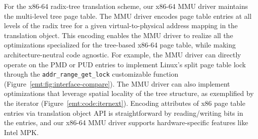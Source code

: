 For the x86-64 radix-tree translation scheme,
our x86-64 MMU driver maintains the multi-level tree page table.
The MMU driver encodes page table entries at all levels of the 
	radix tree for a given 
	virtual-to-physical address mapping in the translation object.
This encoding enables the MMU driver to realize all the optimizations
	specialized for the tree-based x86-64 page table, while 
	making architecture-neutral code agnostic.
For example, the MMU driver can directly operate on the PMD or PUD entries
	to implement Linux's split page table lock~\cite{linux:sptl} through 
	the \texttt{\small addr\_range\_get\_lock} customizable function
	(Figure~\ref{emt:fig:interface-compare}). 
The MMU driver can also implement optimizations that leverage 
	spatial locality of the tree structure,
	as exemplified by the iterator (Figure~\ref{emt:code:iternext}).
Encoding attributes of x86 page table entries via translation object API
	is straightforward by reading/writing bits in the entries, 
	and our x86-64 MMU driver
	supports hardware-specific features like Intel MPK.


